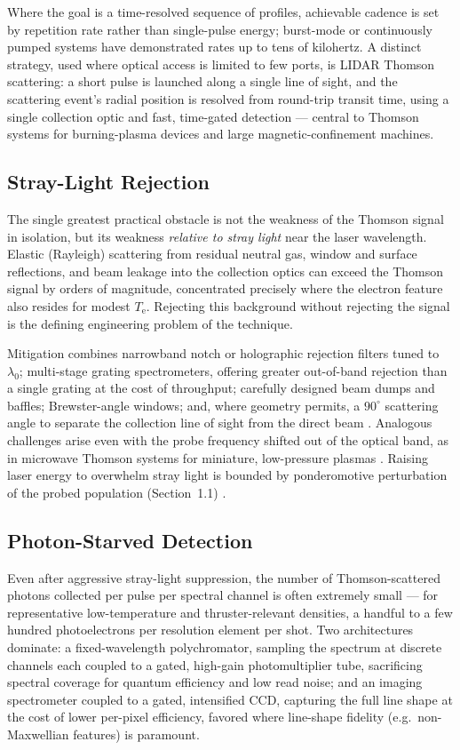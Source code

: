 Where the goal is a time-resolved sequence of profiles, achievable cadence is set by repetition rate rather than single-pulse energy; burst-mode or continuously pumped systems have demonstrated rates up to tens of kilohertz. A distinct strategy, used where optical access is limited to few ports, is LIDAR Thomson scattering: a short pulse is launched along a single line of sight, and the scattering event's radial position is resolved from round-trip transit time, using a single collection optic and fast, time-gated detection — central to Thomson systems for burning-plasma devices and large magnetic-confinement machines.

\subsection{Stray-Light Rejection}

The single greatest practical obstacle is not the weakness of the Thomson signal in isolation, but its weakness \emph{relative to stray light} near the laser wavelength. Elastic (Rayleigh) scattering from residual neutral gas, window and surface reflections, and beam leakage into the collection optics can exceed the Thomson signal by orders of magnitude, concentrated precisely where the electron feature also resides for modest $T_{\mathrm{e}}$. Rejecting this background without rejecting the signal is the defining engineering problem of the technique.

Mitigation combines narrowband notch or holographic rejection filters tuned to $\lambda_{0}$; multi-stage grating spectrometers, offering greater out-of-band rejection than a single grating at the cost of throughput; carefully designed beam dumps and baffles; Brewster-angle windows; and, where geometry permits, a $90^{\circ}$ scattering angle to separate the collection line of sight from the direct beam \cite{ref0383}. Analogous challenges arise even with the probe frequency shifted out of the optical band, as in microwave Thomson systems for miniature, low-pressure plasmas \cite{ref0362}. Raising laser energy to overwhelm stray light is bounded by ponderomotive perturbation of the probed population (Section~1.1) \cite{ref0360}.

\subsection{Photon-Starved Detection}

Even after aggressive stray-light suppression, the number of Thomson-scattered photons collected per pulse per spectral channel is often extremely small — for representative low-temperature and thruster-relevant densities, a handful to a few hundred photoelectrons per resolution element per shot. Two architectures dominate: a fixed-wavelength polychromator, sampling the spectrum at discrete channels each coupled to a gated, high-gain photomultiplier tube, sacrificing spectral coverage for quantum efficiency and low read noise; and an imaging spectrometer coupled to a gated, intensified CCD, capturing the full line shape at the cost of lower per-pixel efficiency, favored where line-shape fidelity (e.g.\ non-Maxwellian features) is paramount.

